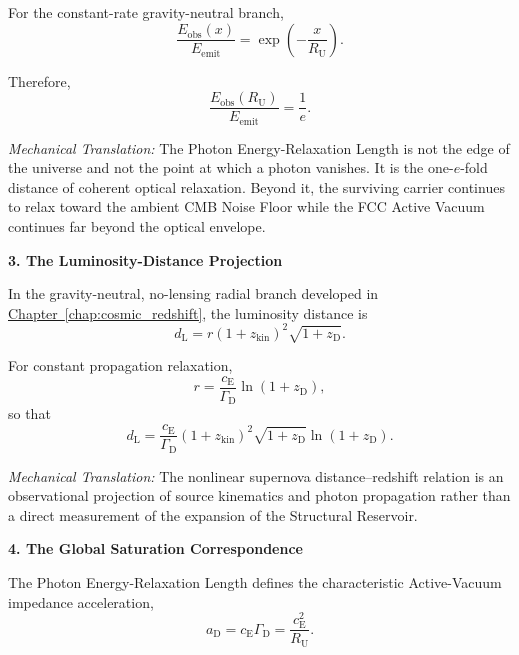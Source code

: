 For the constant-rate gravity-neutral branch,
\begin{equation}
    \frac{E_{\mathrm{obs}}(x)}{E_{\mathrm{emit}}} = \exp\left( -\frac{x}{R_{\mathrm U}} \right).
\end{equation}

Therefore,
\begin{equation}
    \frac{E_{\mathrm{obs}}(R_{\mathrm U})}{E_{\mathrm{emit}}} = \frac{1}{e}.
\end{equation}

\textit{Mechanical Translation:} The Photon Energy-Relaxation Length is not the edge of the universe and not the point at which a photon vanishes. It is the one-$e$-fold distance of coherent optical relaxation. Beyond it, the surviving carrier continues to relax toward the ambient CMB Noise Floor while the FCC Active Vacuum continues far beyond the optical envelope.

\vspace{0.5em}

\noindent\textbf{3. The Luminosity-Distance Projection}

In the gravity-neutral, no-lensing radial branch developed in \hyperref[chap:cosmic_redshift]{Chapter~\ref*{chap:cosmic_redshift}}, the luminosity distance is
\begin{equation}
    d_{\mathrm L} = r (1+z_{\mathrm{kin}})^2 \sqrt{1+z_{\mathrm D}}.
\end{equation}

For constant propagation relaxation,
\begin{equation}
    r = \frac{c_{\mathrm E}}{\Gamma_{\mathrm D}} \ln(1+z_{\mathrm D}),
\end{equation}
so that
\begin{equation}
    d_{\mathrm L} = \frac{c_{\mathrm E}}{\Gamma_{\mathrm D}} (1+z_{\mathrm{kin}})^2 \sqrt{1+z_{\mathrm D}} \ln(1+z_{\mathrm D}).
\end{equation}

\textit{Mechanical Translation:} The nonlinear supernova distance--redshift relation is an observational projection of source kinematics and photon propagation rather than a direct measurement of the expansion of the Structural Reservoir.

\vspace{0.5em}

\noindent\textbf{4. The Global Saturation Correspondence}

The Photon Energy-Relaxation Length defines the characteristic Active-Vacuum impedance acceleration,
\begin{equation}
    a_{\mathrm D} = c_{\mathrm E}\Gamma_{\mathrm D} = \frac{c_{\mathrm E}^2}{R_{\mathrm U}}.
\end{equation}

